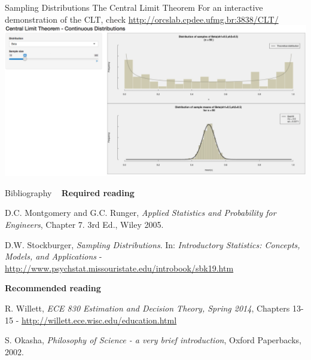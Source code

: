 \documentclass[t]{beamer}
\begin{document}
\begin{ftst}
{Sampling Distributions}
{The Central Limit Theorem}
For an interactive demonstration of the CLT, check 
{\small\url{http://orcslab.cpdee.ufmg.br:3838/CLT/}}
\vone
{\centering\includegraphics[width=\textwidth]{../figs/CLTdemo.png}}
\end{ftst}



\begin{ftst}
{Bibliography}
{\ }
\scriptsize
\textbf{Required reading}

\benums D.C. Montgomery and G.C. Runger, \textit{Applied Statistics and Probability for Engineers}, Chapter 7. 3rd Ed., Wiley 2005.
\item D.W. Stockburger, \textit{Sampling Distributions}. In: \textit{Introductory Statistics: Concepts, Models, and Applications} - \url{http://www.psychstat.missouristate.edu/introbook/sbk19.htm}
\eenum

\textbf{Recommended reading}

\benums R. Willett, \textit{ ECE 830 Estimation and Decision Theory, Spring 2014}, Chapters 13-15 - \url{http://willett.ece.wisc.edu/education.html}
\item S. Okasha, \textit{Philosophy of Science - a very brief introduction}, Oxford Paperbacks, 2002.
\eenum
\end{ftst}

\end{document}
